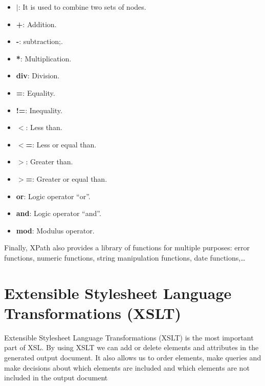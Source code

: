 \begin{itemize}

\item \textbf{$|$}: It is used to combine two sets of nodes.

\item \textbf{+}: Addition.

\item \textbf{-}: subtraction;.

\item \textbf{*}: Multiplication.

\item \textbf{div}: Division.

\item \textbf{=}: Equality.

\item \textbf{!=}: Inequality.

\item \textbf{$<$}: Less than.

\item \textbf{$<$=}: Less or equal than.

\item \textbf{$>$}: Greater than.

\item \textbf{$>$=}: Greater or equal than.

\item \textbf{or}: Logic operator ``or''.

\item \textbf{and}: Logic operator ``and''.

\item \textbf{mod}: Modulus operator.

\end{itemize}

Finally, XPath also provides a library of functions for multiple purposes: error functions, numeric functions, string manipulation functions, date functions,\ldots

\section{Extensible Stylesheet Language Transformations (XSLT)}\label{XSLT}

Extensible Stylesheet Language Transformations (XSLT) \cite{W3C1999-2} is the most important part of XSL. By using XSLT we can add or delete elements and attributes in the generated output document. It also allows us to order elements, make queries and make decisions about which elements are included and which elements are not included in the output document


